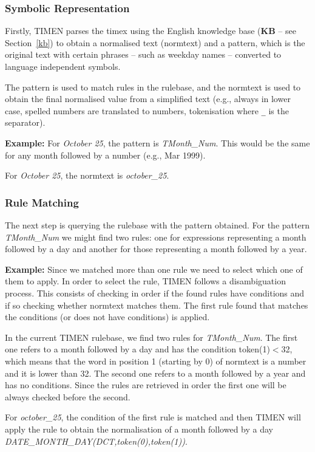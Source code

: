 \documentclass[10pt, a4paper]{article}
\begin{document}
\subsubsection{Symbolic Representation}

Firstly, TIMEN parses the timex using the English knowledge base (\textbf{KB} -- see Section~\ref{kb}) to obtain a normalised text (normtext) and a pattern, which is the original text with certain phrases -- such as weekday names -- converted to language independent symbols.

The pattern is used to match rules in the rulebase, and the normtext is used to obtain the final normalised value from a simplified text (e.g., always in lower case, spelled numbers are translated to numbers, tokenisation where \texttt{\_} is the separator).

\textbf{Example:}
For \textit{October 25}, the pattern is \textit{TMonth\_Num}. This would be the same for any month followed by a number (e.g., Mar 1999).

For \textit{October 25}, the normtext is \textit{october\_25}.

\subsubsection{Rule Matching}
The next step is querying the rulebase with the pattern obtained. For the pattern \textit{TMonth\_Num} we might find two rules: one for expressions representing a month followed by a day and another for those representing a month followed by a year.

\textbf{Example:}
Since we matched more than one rule we need to select which one of them to apply. In order to select the rule, TIMEN follows a disambiguation process.
This consists of checking in order if the found rules have conditions and if so checking whether normtext matches them. The first rule found that matches the conditions (or does not have conditions) is applied.

In the current TIMEN rulebase, we find two rules for \textit{TMonth\_Num}. The first one refers to a month followed by a day and has the condition token(1)$<$32, which means that the word in position 1 (starting by 0) of normtext is a number and it is lower than 32. The second one refers to a month followed by a year and has no conditions. Since the rules are retrieved in order the first one will be always checked before the second.

For \textit{october\_25}, the condition of the first rule is matched and then TIMEN will apply the rule to obtain the normalisation of a month followed by a day \textit{DATE\_MONTH\_DAY(DCT,token(0),token(1))}.
\end{document}
